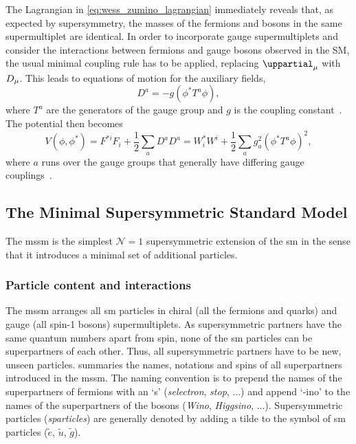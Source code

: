 The Lagrangian in \cref{eq:wess_zumino_lagrangian} immediately reveals that, as expected by supersymmetry, the masses of the fermions and bosons in the same supermultiplet are identical. In order to incorporate gauge supermultiplets and consider the interactions between fermions and gauge bosons observed in the SM, the usual minimal coupling rule has to be applied, replacing $\uppartial_\mu$ with $\mathop{}\!D_\mu$. This leads to equations of motion for the auxiliary fields,
\begin{equation}
	D^a = -g(\phi^*T^a\phi),
\end{equation}
where $T^a$ are the generators of the gauge group and $g$ is the coupling constant~\cite{Bustamante:2009us}. The potential then becomes
\begin{equation}
	V(\phi,\phi^*) = F^{*i}F_i + \frac{1}{2} \sum_a{D^aD^a} = W^*_iW^i + \frac{1}{2}\sum_a{g^2_a(\phi^*T^a\phi)^2} ,
\end{equation}
where $a$ runs over the gauge groups that generally have differing gauge couplings~\cite{Bustamante:2009us}.


 
\subsection{The Minimal Supersymmetric Standard Model}\label{sec:mssm_intro}


The \gls{mssm} is the simplest $\mathcal{N}=1$ supersymmetric extension of the \gls{sm} in the sense that it introduces a minimal set of additional particles.

\subsubsection{Particle content and interactions}\label{sec:mssm_particle_content}

The \gls{mssm} arranges all \gls{sm} particles in chiral (all the fermions and quarks) and gauge (all spin-1 bosons) supermultiplets. As supersymmetric partners have the same quantum numbers apart from spin, none of the \gls{sm} particles can be superpartners of each other.
Thus, all supersymmetric partners have to be new, unseen particles.  summaries the names, notations and spins of all superpartners introduced in the \gls{mssm}.
The naming convention is to prepend the names of the superpartners of fermions with an `s' (\eg \textit{selectron}, \textit{stop}, ...) and append `-ino' to the names of the superpartners of the bosons (\eg \textit{Wino}, \textit{Higgsino}, ...).
Supersymmetric particles (\textit{sparticles}) are generally denoted by adding a tilde to the symbol of \gls{sm} particles (\eg $\tilde{e}$, $\tilde{u}$, $\tilde{g}$). 

